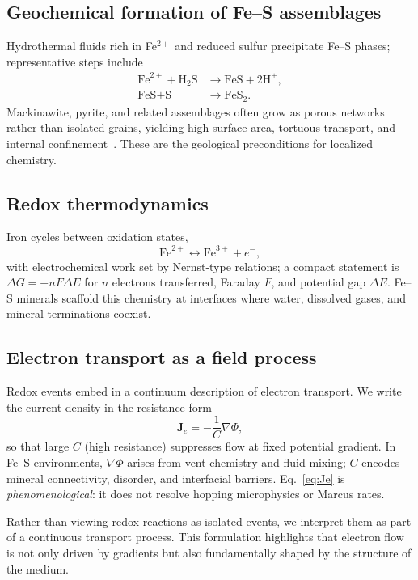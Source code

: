 \documentclass[11pt,a4paper]{article}
\begin{document}
\subsection{Geochemical formation of Fe--S assemblages}
Hydrothermal fluids rich in Fe$^{2+}$ and reduced sulfur precipitate Fe--S phases; representative steps include
\begin{align}
\text{Fe}^{2+} + \text{H}_2\text{S} &\rightarrow \text{FeS} + 2\text{H}^+,\\
\text{FeS} + \text{S} &\rightarrow \text{FeS}_2.
\end{align}
Mackinawite, pyrite, and related assemblages often grow as porous networks rather than isolated grains, yielding high surface area, tortuous transport, and internal confinement~\cite{Martin2007,Hazen2008}. These are the geological preconditions for localized chemistry.

\subsection{Redox thermodynamics}
Iron cycles between oxidation states,
\begin{equation}
\text{Fe}^{2+} \leftrightarrow \text{Fe}^{3+} + e^-,
\end{equation}
with electrochemical work set by Nernst-type relations; a compact statement is $\Delta G = -n F \Delta E$ for $n$ electrons transferred, Faraday $F$, and potential gap $\Delta E$. Fe--S minerals scaffold this chemistry at interfaces where water, dissolved gases, and mineral terminations coexist.

\subsection{Electron transport as a field process}
Redox events embed in a continuum description of electron transport. We write the current density in the resistance form
\begin{equation}
\bm{J}_e = -\frac{1}{C}\nabla\Phi,
\label{eq:Je}
\end{equation}
so that large $C$ (high resistance) suppresses flow at fixed potential gradient. In Fe--S environments, $\nabla\Phi$ arises from vent chemistry and fluid mixing; $C$ encodes mineral connectivity, disorder, and interfacial barriers. Eq.~\eqref{eq:Je} is \emph{phenomenological}: it does not resolve hopping microphysics or Marcus rates.

Rather than viewing redox reactions as isolated events, we interpret them as part of a continuous transport process. This formulation highlights that electron flow is not only driven by gradients but also fundamentally shaped by the structure of the medium.
\end{document}
